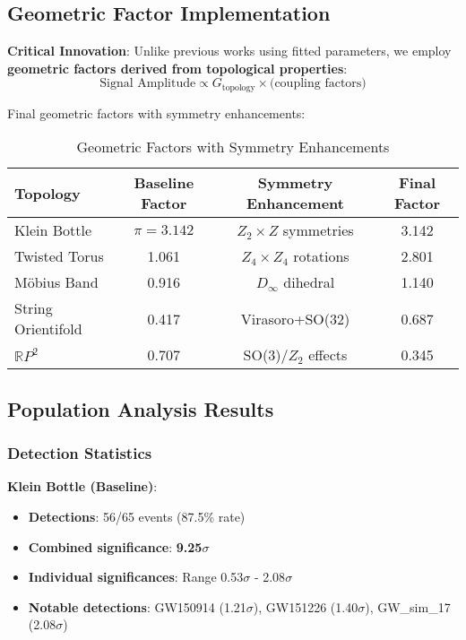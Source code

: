 \documentclass[11pt,a4paper]{article}
\begin{document}
\subsection{Geometric Factor Implementation}

\textbf{Critical Innovation}: Unlike previous works using fitted parameters, we employ \textbf{geometric factors derived from topological properties}:
\begin{equation}
\text{Signal Amplitude} \propto G_{\text{topology}} \times \text{(coupling factors)}
\end{equation}

Final geometric factors with symmetry enhancements:

\begin{table}[H]
\centering
\caption{Geometric Factors with Symmetry Enhancements}
\begin{tabular}{@{}lccc@{}}
\toprule
\textbf{Topology} & \textbf{Baseline Factor} & \textbf{Symmetry Enhancement} & \textbf{Final Factor} \\
\midrule
Klein Bottle & $\pi = 3.142$ & $Z_2 \times Z$ symmetries & 3.142 \\
Twisted Torus & 1.061 & $Z_4 \times Z_4$ rotations & 2.801 \\
Möbius Band & 0.916 & $D_\infty$ dihedral & 1.140 \\
String Orientifold & 0.417 & Virasoro+SO(32) & 0.687 \\
$\mathbb{R}P^2$ & 0.707 & SO(3)/$Z_2$ effects & 0.345 \\
\bottomrule
\end{tabular}
\label{tab:geometric_factors}
\end{table}

\subsection{Population Analysis Results}

\subsubsection{Detection Statistics}

\textbf{Klein Bottle (Baseline)}:
\begin{itemize}
    \item \textbf{Detections}: 56/65 events (87.5\% rate)
    \item \textbf{Combined significance}: \textbf{9.25$\sigma$}
    \item \textbf{Individual significances}: Range 0.53$\sigma$ - 2.08$\sigma$
    \item \textbf{Notable detections}: GW150914 (1.21$\sigma$), GW151226 (1.40$\sigma$), GW\_sim\_17 (2.08$\sigma$)
\end{itemize}
\end{document}
